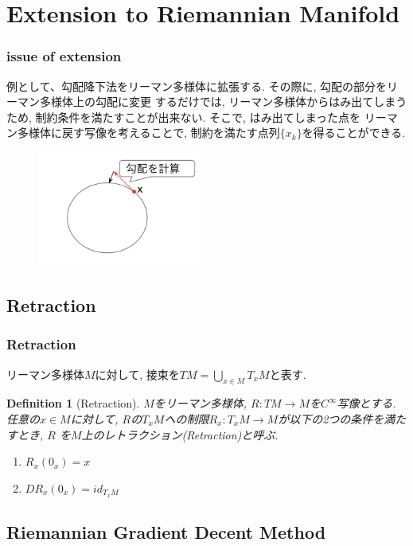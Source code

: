 \documentclass[dvipdfmx,11pt]{beamer}		%
\newtheorem{defi}{Definition}
\newcommand{\tpm}{T_xM}
\begin{document}
    
   
    \section{Extension to Riemannian Manifold}

    \begin{frame}\frametitle{issue of extension}
        例として、勾配降下法をリーマン多様体に拡張する. その際に, 勾配の部分をリーマン多様体上の勾配に変更
        するだけでは, リーマン多様体からはみ出てしまうため, 制約条件を満たすことが出来ない. そこで, はみ出てしまった点を
        リーマン多様体に戻す写像を考えることで, 制約を満たす点列$\{x_k\}$を得ることができる.
        \begin{figure}
            \centering
            \includegraphics[width = 5.5cm]{../Images/grad_image.png}
        \end{figure}
    \end{frame}
    \subsection{Retraction}
    \begin{frame}\frametitle{Retraction}
        リーマン多様体$M$に対して, 接束を$\displaystyle TM = \bigcup_{x\in M}\tpm$と表す.
        \begin{defi}[Retraction]
            $M$をリーマン多様体, $R : TM\to M$を$C^\infty$写像とする. 
            任意の$x\in M$に対して, $R$の$\tpm$への制限$R_x : \tpm\to M$が以下の2つの条件を満たすとき, $R$
            を$M$上のレトラクション(Retraction)と呼ぶ.
            \begin{enumerate}
                \item $R_x(0_x) = x$
                \item $DR_x(0_x) = id_{\tpm}$
            \end{enumerate}
        \end{defi}
    \end{frame}


    \subsection{Riemannian Gradient Decent Method}
    
\end{document}
